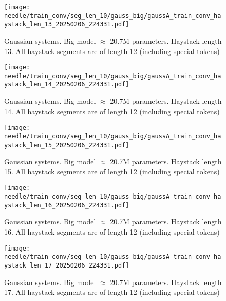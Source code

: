 \begin{figure}[h]
    \centering
    \texttt{[image: needle/train\_conv/seg\_len\_10/gauss\_big/gaussA\_train\_conv\_haystack\_len\_13\_20250206\_224331.pdf]}
    \caption{Gaussian systems. Big model $\approx$ 20.7M parameters. Haystack length 13. All haystack segments are of length 12 (including special tokens)}
    \label{fig:gauss_small_needle_train_conv_haystack_len_13_all_haystack_len_12}

\end{figure}


\begin{figure}[h]
    \centering
    \texttt{[image: needle/train\_conv/seg\_len\_10/gauss\_big/gaussA\_train\_conv\_haystack\_len\_14\_20250206\_224331.pdf]}
    \caption{Gaussian systems. Big model $\approx$ 20.7M parameters. Haystack length 14. All haystack segments are of length 12 (including special tokens)}
    \label{fig:gauss_small_needle_train_conv_haystack_len_14_all_haystack_len_12}

\end{figure}


\begin{figure}[h]
    \centering
    \texttt{[image: needle/train\_conv/seg\_len\_10/gauss\_big/gaussA\_train\_conv\_haystack\_len\_15\_20250206\_224331.pdf]}
    \caption{Gaussian systems. Big model $\approx$ 20.7M parameters. Haystack length 15. All haystack segments are of length 12 (including special tokens)}
    \label{fig:gauss_small_needle_train_conv_haystack_len_15_all_haystack_len_12}

\end{figure}


\begin{figure}[h]
    \centering
    \texttt{[image: needle/train\_conv/seg\_len\_10/gauss\_big/gaussA\_train\_conv\_haystack\_len\_16\_20250206\_224331.pdf]}
    \caption{Gaussian systems. Big model $\approx$ 20.7M parameters. Haystack length 16. All haystack segments are of length 12 (including special tokens)}
    \label{fig:gauss_small_needle_train_conv_haystack_len_16_all_haystack_len_12}

\end{figure}


\begin{figure}[h]
    \centering
    \texttt{[image: needle/train\_conv/seg\_len\_10/gauss\_big/gaussA\_train\_conv\_haystack\_len\_17\_20250206\_224331.pdf]}
    \caption{Gaussian systems. Big model $\approx$ 20.7M parameters. Haystack length 17. All haystack segments are of length 12 (including special tokens)}
    \label{fig:gauss_small_needle_train_conv_haystack_len_17_all_haystack_len_12}

\end{figure}


